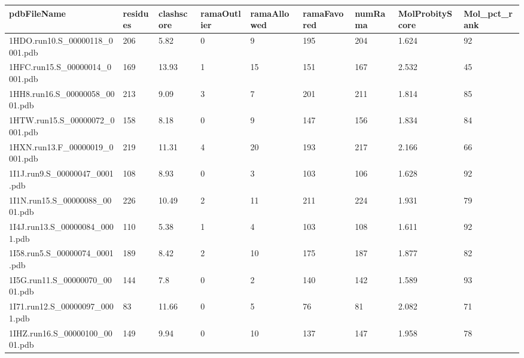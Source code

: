 \documentclass{bioinfo}
\begin{document}
\begin{table}[!t]
{\begin{tabular}{lllllllll}\toprule
    pdbFileName             & residues & clashscore & ramaOutlier & ramaAllowed & ramaFavored & numRama & MolProbityScore & Mol\_pct\_rank \\ \midrule
    1HDO.run10.S\_00000118\_0001.pdb & 206      & 5.82       & 0           & 9           & 195         & 204     & 1.624           & 92           \\
    1HFC.run15.S\_00000014\_0001.pdb & 169      & 13.93      & 1           & 15          & 151         & 167     & 2.532           & 45           \\
    1HH8.run16.S\_00000058\_0001.pdb & 213      & 9.09       & 3           & 7           & 201         & 211     & 1.814           & 85           \\
    1HTW.run15.S\_00000072\_0001.pdb & 158      & 8.18       & 0           & 9           & 147         & 156     & 1.834           & 84           \\
    1HXN.run13.F\_00000019\_0001.pdb & 219      & 11.31      & 4           & 20          & 193         & 217     & 2.166           & 66           \\
    1I1J.run9.S\_00000047\_0001.pdb & 108      & 8.93       & 0           & 3           & 103         & 106     & 1.628           & 92           \\
    1I1N.run15.S\_00000088\_0001.pdb & 226      & 10.49      & 2           & 11          & 211         & 224     & 1.931           & 79           \\
    1I4J.run13.S\_00000084\_0001.pdb & 110      & 5.38       & 1           & 4           & 103         & 108     & 1.611           & 92           \\
    1I58.run5.S\_00000074\_0001.pdb & 189      & 8.42       & 2           & 10          & 175         & 187     & 1.877           & 82           \\
    1I5G.run11.S\_00000070\_0001.pdb & 144      & 7.8        & 0           & 2           & 140         & 142     & 1.589           & 93           \\
    1I71.run12.S\_00000097\_0001.pdb & 83       & 11.66      & 0           & 5           & 76          & 81      & 2.082           & 71           \\
    1IHZ.run16.S\_00000100\_0001.pdb & 149      & 9.94       & 0           & 10          & 137         & 147     & 1.958           & 78           \\

\end{tabular}}
\end{table}
\end{document}
